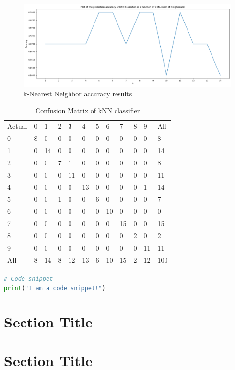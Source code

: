 \begin{figure}[H]
    \centering
    \includegraphics[width=\textwidth]{images/knn.png}
    \caption{k-Nearest Neighbor accuracy results}
    \setlength{\belowcaptionskip}{-20pt}
    \setlength{\abovecaptionskip}{-20pt}
\end{figure}

\lipsum[1-1]

\begin{table}[]
    \centering
    \begin{tabular}{llllllllllll}
        Actual & 0 & 1  & 2 & 3  & 4  & 5 & 6  & 7  & 8 & 9  & All \\
        0      & 8 & 0  & 0 & 0  & 0  & 0 & 0  & 0  & 0 & 0  & 8   \\
        1      & 0 & 14 & 0 & 0  & 0  & 0 & 0  & 0  & 0 & 0  & 14  \\
        2      & 0 & 0  & 7 & 1  & 0  & 0 & 0  & 0  & 0 & 0  & 8   \\
        3      & 0 & 0  & 0 & 11 & 0  & 0 & 0  & 0  & 0 & 0  & 11  \\
        4      & 0 & 0  & 0 & 0  & 13 & 0 & 0  & 0  & 0 & 1  & 14  \\
        5      & 0 & 0  & 1 & 0  & 0  & 6 & 0  & 0  & 0 & 0  & 7   \\
        6      & 0 & 0  & 0 & 0  & 0  & 0 & 10 & 0  & 0 & 0  & 0   \\
        7      & 0 & 0  & 0 & 0  & 0  & 0 & 0  & 15 & 0 & 0  & 15  \\
        8      & 0 & 0  & 0 & 0  & 0  & 0 & 0  & 0  & 2 & 0  & 2   \\
        9      & 0 & 0  & 0 & 0  & 0  & 0 & 0  & 0  & 0 & 11 & 11  \\
        All    & 8 & 14 & 8 & 12 & 13 & 6 & 10 & 15 & 2 & 12 & 100   
    \end{tabular}
    \caption*{Confusion Matrix of kNN classifier}
\end{table}


\begin{lstlisting}[language=Python, caption=Caption for the snippet]
# Code snippet
print("I am a code snippet!")
\end{lstlisting}


\section*{Section Title}

\lipsum[1-3]

\section*{Section Title}
\lipsum[1-2]

